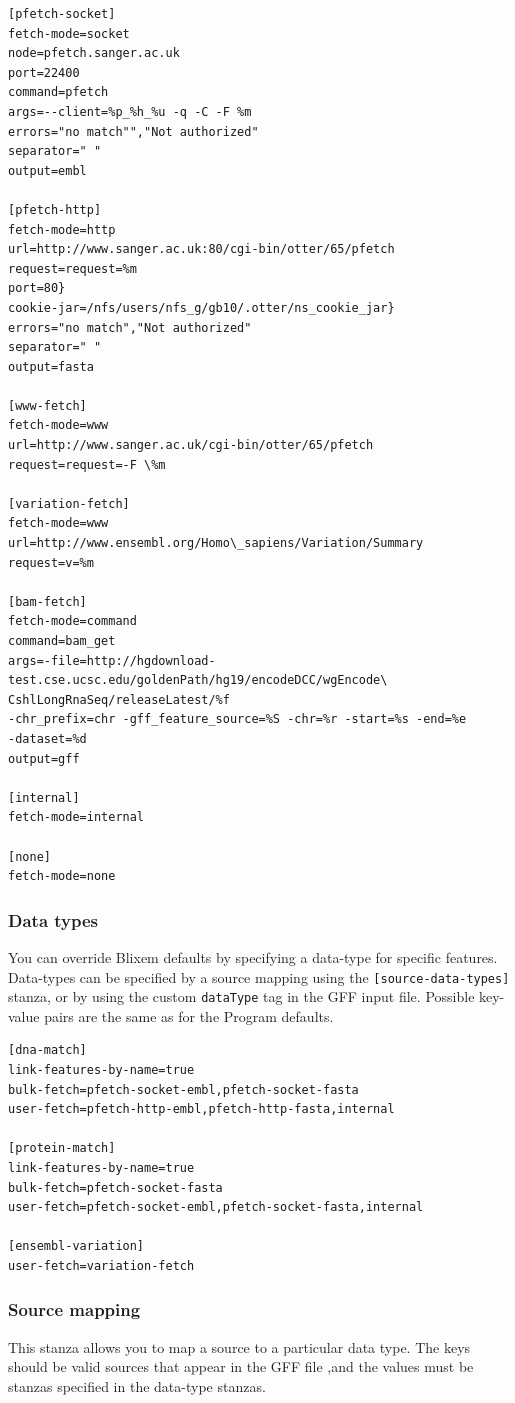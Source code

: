 \documentclass[letterpaper]{article}
\newcommand\textstyleSourceText[1]{\texttt{#1}}
\begin{document}
\begin{verbatim}
[pfetch-socket]
fetch-mode=socket
node=pfetch.sanger.ac.uk
port=22400
command=pfetch
args=--client=%p_%h_%u -q -C -F %m
errors="no match"","Not authorized"
separator=" "
output=embl

[pfetch-http]
fetch-mode=http
url=http://www.sanger.ac.uk:80/cgi-bin/otter/65/pfetch
request=request=%m
port=80}
cookie-jar=/nfs/users/nfs_g/gb10/.otter/ns_cookie_jar}
errors="no match","Not authorized"
separator=" "
output=fasta

[www-fetch]
fetch-mode=www
url=http://www.sanger.ac.uk/cgi-bin/otter/65/pfetch
request=request=-F \%m

[variation-fetch]
fetch-mode=www
url=http://www.ensembl.org/Homo\_sapiens/Variation/Summary
request=v=%m

[bam-fetch]
fetch-mode=command
command=bam_get
args=-file=http://hgdownload-test.cse.ucsc.edu/goldenPath/hg19/encodeDCC/wgEncode\
CshlLongRnaSeq/releaseLatest/%f
-chr_prefix=chr -gff_feature_source=%S -chr=%r -start=%s -end=%e
-dataset=%d
output=gff

[internal]
fetch-mode=internal

[none]
fetch-mode=none
\end{verbatim}

{\color[rgb]{0.30980393,0.5058824,0.7411765}\subsubsection[Data types ]{Data types }}
\hypertarget{RefHeading37731724351149}{}{
You can override Blixem defaults by specifying a data-type for specific
features. Data-types can be specified by a source mapping using the
\texttt{[source-data-types]} stanza, or by using the custom
\textstyleSourceText{dataType} tag in the GFF input file. Possible
key-value pairs are the same as for the Program defaults. }

\bigskip

\begin{verbatim}
[dna-match]
link-features-by-name=true
bulk-fetch=pfetch-socket-embl,pfetch-socket-fasta
user-fetch=pfetch-http-embl,pfetch-http-fasta,internal

[protein-match]
link-features-by-name=true
bulk-fetch=pfetch-socket-fasta
user-fetch=pfetch-socket-embl,pfetch-socket-fasta,internal

[ensembl-variation]
user-fetch=variation-fetch
\end{verbatim}

{\color[rgb]{0.30980393,0.5058824,0.7411765}\subsubsection[Source mapping ]{Source mapping }}
\hypertarget{RefHeading37751724351149}{}{
This stanza allows you to map a source to a particular data type. The
keys should be valid sources that appear in the GFF file ,and the
values must be stanzas specified in the data-type stanzas. }
\end{document}

